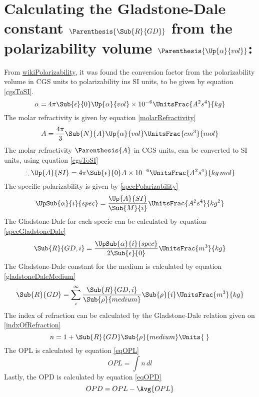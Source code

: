     \section{Calculating the Gladstone-Dale constant $\Parenthesis{\Sub{R}{GD}}$ from the polarizability volume $\Parenthesis{\Up{\alpha}{vol}}$:}
    \indent From \href{https://en.wikipedia.org/wiki/Polarizability}{wikiPolarizability}, it was found the conversion factor from the polarizability volume in CGS units to polarizability ins SI units, to be given by equation \eqref{cgsToSI}. 
    \begin{equation}\label{cgsToSI}
        \alpha = 4\pi\Sub{\epsilon}{0}\Up{\alpha}{vol}\times10^{-6}\UnitsFrac{A^2s^4}{kg} 
    \end{equation}
    \indent The molar refractivity is given by equation \eqref{molarRefractivity} 
    \begin{equation}\label{molarRefractivity}
        A = \frac{4\pi}{3}\Sub{N}{A}\Up{\alpha}{vol}\UnitsFrac{cm^3}{mol} 
    \end{equation}
    \indent The molar refractivity $\Parenthesis{A}$ in CGS units, can be converted to SI units, using equation \eqref{cgsToSI}
    $$ \therefore \Up{A}{SI} = 4\pi\Sub{\epsilon}{0}A\times 10^{-6}\UnitsFrac{A^2s^4}{kg\,mol} $$
    \indent The specific polarizability is given by \eqref{specPolarizability}
    \begin{equation}\label{specPolarizability}
        \UpSub{\alpha}{i}{spec} = \frac{\Up{A}{SI}}{\Sub{M}{i}}\UnitsFrac{A^2s^4}{kg^2}
    \end{equation}
    \indent The Gladstone-Dale for each specie can be calculated by equation \eqref{specGladstoneDale}
    \begin{equation}\label{specGladstoneDale}
        \Sub{R}{GD,i} = \frac{\UpSub{\alpha}{i}{spec}}{2\Sub{\epsilon}{0}}\UnitsFrac{m^3}{kg}
    \end{equation}
    \indent The Gladstone-Dale constant for the medium is calculated by equation \eqref{gladstoneDaleMedium}
    \begin{equation}\label{gladstoneDaleMedium}
        \Sub{R}{GD} = \sum_{i}^{\infty}\frac{\Sub{R}{GD,i}}{\Sub{\rho}{medium}}\Sub{\rho}{i}\UnitsFrac{m^3}{kg} 
    \end{equation}
    \indent The index of refraction can be calculated by the Gladstone-Dale relation given on \eqref{indxOfRefraction}
    \begin{equation}\label{indxOfRefraction}
        n = 1 + \Sub{R}{GD}\Sub{\rho}{medium}\Units{\;}
    \end{equation}
    \indent The OPL is calculated by equation \eqref{eqOPL}
    \begin{equation}\label{eqOPL}
        OPL = \int n \,dl 
    \end{equation}
    \indent Lastly, the OPD is calculated by equation \eqref{eqOPD}
    \begin{equation}\label{eqOPD}
        OPD = OPL - \Avg{OPL}
    \end{equation}



